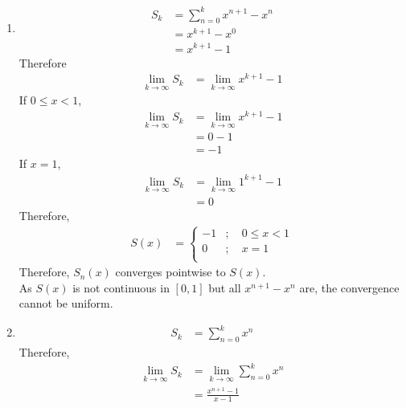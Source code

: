 \documentclass[fleqn, a4paper, 11pt, oneside]{amsart}
\theoremstyle{definition}
\theoremstyle{theorem}
\begin{document}
\begin{solution}
	\begin{enumerate}[leftmargin = *]
		\item
			\begin{align*}
				S_k & = \sum\limits_{n = 0}^{k} x^{n + 1} - x^n \\
                                    & = x^{k + 1} - x^0                         \\
                                    & = x^{k + 1} - 1
			\end{align*}
			Therefore
			\begin{align*}
				\lim\limits_{k \to \infty} S_k & = \lim\limits_{k \to \infty} x^{k + 1} - 1
			\end{align*}
			If $0 \le x < 1$,
			\begin{align*}
				\lim\limits_{k \to \infty} S_k & = \lim\limits_{k \to \infty} x^{k + 1} - 1 \\
                                                               & = 0 - 1                                    \\
                                                               & = -1
			\end{align*}
			If $x = 1$,
			\begin{align*}
				\lim\limits_{k \to \infty} S_k & = \lim\limits_{k \to \infty} 1^{k + 1} - 1 \\
                                                               & = 0
			\end{align*}
			Therefore,
			\begin{align*}
				S(x) &=
					\begin{cases}
						-1 & ;\quad 0 \le x < 1 \\
						0  & ;\quad x = 1       \\
					\end{cases}
			\end{align*}
			Therefore, $S_n(x)$ converges pointwise to $S(x)$.\\
			As $S(x)$ is not continuous in $[0,1]$ but all $x^{n + 1} - x^n$ are, the convergence cannot be uniform.
		\item
			\begin{align*}
				S_k & = \sum\limits_{n = 0}^{k} x^n
			\end{align*}
			Therefore,
			\begin{align*}
				\lim\limits_{k \to \infty} S_k & = \lim\limits_{k \to \infty} \sum\limits_{n = 0}^{k} x^n \\
                                                               & = \frac{x^{n + 1} - 1}{x - 1}

\end{align*}
\end{enumerate}
\end{solution}
\end{document}
